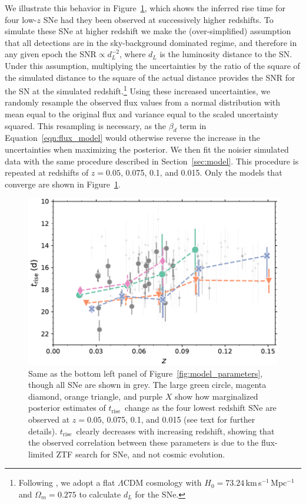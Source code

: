 \documentclass[twocolumn]{./aastex63}
\newcommand{\trise}{$t_\mathrm{rise}$}
\begin{document}
We illustrate this behavior in Figure~\ref{fig:high_z_systematic}, which shows
the inferred rise time for four low-$z$ SNe had they been observed at
successively higher redshifts. To simulate these SNe at higher redshift we
make the (over-simplified) assumption that all detections are in the
sky-background dominated regime, and therefore in any given epoch the
$\mathrm{SNR} \propto d_L^{-2}$, where $d_L$ is the luminosity distance to the
SN. Under this assumption, multiplying the uncertainties by the ratio of the
square of the simulated distance to the square of the actual distance provides
the SNR for the SN at the simulated redshift.\footnote{Following
\citet{Yao19}, we adopt a flat $\Lambda$CDM cosmology with $H_0 =
73.24$\,km\,s$^{-1}$\,Mpc$^{-1}$ \citep{Riess16} and $\Omega_m = 0.275$
\citep{Amanullah10} to calculate $d_L$ for the SNe.} Using these increased
uncertainties, we randomly resample the observed flux values from a normal
distribution with mean equal to the original flux and variance equal to the
scaled uncertainty squared. This resampling is necessary, as the $\beta_d$
term in Equation~\ref{eqn:flux_model} would otherwise reverse the increase in
the uncertainties when maximizing the posterior. We then fit the noisier
simulated data with the same procedure described in Section~\ref{sec:model}.
This procedure is repeated at redshifts of $z = 0.05$, 0.075, 0.1, and 0.015.
Only the models that converge are shown in Figure~\ref{fig:high_z_systematic}.

\begin{figure}
    \centering
    \includegraphics[width=1\linewidth]{./figures/high_z_systematic.pdf}
    \caption{Same as the bottom left panel of
    Figure~\ref{fig:model_parameters}, though all SNe are shown in grey. The
    large green circle, magenta diamond, orange triangle, and purple $X$ show
    how marginalized posterior estimates of \trise\ change as the four lowest
    redshift SNe are observed at $z = 0.05$, 0.075, 0.1, and 0.015 (see text
    for further details). \trise\ clearly decreases with increasing redshift,
    showing that the observed correlation between these parameters is due to
    the flux-limited ZTF search for SNe, and not cosmic evolution.}
    \label{fig:high_z_systematic}
\end{figure}
\end{document}
